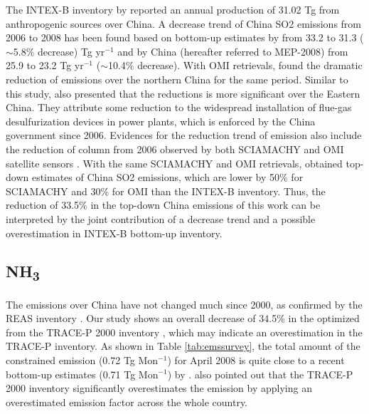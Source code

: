   The INTEX-B inventory by \citet{Zhang09b} reported an annual production of 
31.02 Tg from anthropogenic sources over China. 
A decrease trend of China SO2 emissions from 2006 to 2008 has been found based
on bottom-up estimates by \citet{Lu10} from 33.2 to 31.3 ( $\sim$5.8\% decrease) Tg yr$^{-1}$
and by China \citet{MEP09} (hereafter referred to MEP-2008) from 25.9 to 
23.2 Tg yr$^{-1}$ ($\sim$10.4\% decrease).
With OMI  retrievals, \citet{Lu10} found the dramatic reduction of 
 emissions over the northern China for the same period. 
Similar to this study, \citet{Lu10} also presented that the reductions is more
significant over the Eastern China. They attribute some reduction to the 
widespread installation of flue-gas desulfurization devices in power plants,
which is enforced by the China government since 2006. 
Evidences for the reduction trend of  emission also include the reduction 
of  column from 2006 observed by both SCIAMACHY and OMI satellite sensors \citep{Lu11}.
With the same SCIAMACHY and OMI  retrievals, \citet{Lee11} obtained 
top-down estimates of China SO2 emissions, which are lower by 50\% for 
SCIAMACHY and 30\% for OMI than the INTEX-B inventory. 
Thus, the reduction of 33.5\% in the top-down China  emissions of this 
work can be interpreted by the joint contribution of a decrease trend and a 
possible overestimation in INTEX-B bottom-up inventory.

 \subsection{NH\textsubscript{3} } 

  The  emissions over China have not changed much since 2000, as 
confirmed by the REAS inventory \citep{Ohara07}. Our study shows an overall 
decrease of 34.5\% in the optimized from the TRACE-P 2000 inventory \citep{Streets03},
which may indicate an overestimation in the TRACE-P inventory. 
As shown in Table \ref{tab:emssurvey}, the total amount of the constrained 
 emission (0.72 Tg Mon$^{-1}$) for April 2008 is quite close to a 
recent bottom-up estimates (0.71 Tg Mon$^{-1}$) by \citet{Huang12}. 
\citet{Huang12} also pointed out that the TRACE-P 2000 inventory significantly
overestimates the  emission by applying an overestimated emission 
factor across the whole country. 


